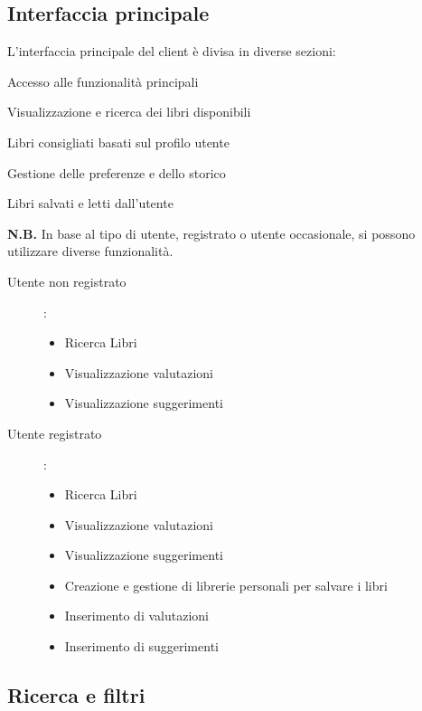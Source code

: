 \documentclass[12pt,a4paper]{article}
\begin{document}
\subsection{Interfaccia principale}

L'interfaccia principale del client è divisa in diverse sezioni:

\begin{description}[style=multiline, labelwidth=4cm, leftmargin=4.4cm]
    \item[Menu principale] Accesso alle funzionalità principali
    \item[Catalogo libri] Visualizzazione e ricerca dei libri disponibili
    \item[Raccomandazioni] Libri consigliati basati sul profilo utente
    \item[Profilo utente] Gestione delle preferenze e dello storico
    \item[Biblioteca personale] Libri salvati e letti dall'utente
\end{description}
\textbf{N.B.}
In base al tipo di utente, registrato o utente occasionale, si possono utilizzare diverse funzionalità.
\begin{description}
    \item[Utente non registrato]:
    \begin{itemize}
        \item Ricerca Libri
        \item Visualizzazione valutazioni
        \item Visualizzazione suggerimenti
    \end{itemize}
    \item[Utente registrato]:
    \begin{itemize}
        \item Ricerca Libri
        \item Visualizzazione valutazioni
        \item Visualizzazione suggerimenti
        \item Creazione e gestione di librerie personali per salvare i libri
        \item Inserimento di valutazioni
        \item Inserimento di suggerimenti
    \end{itemize}
\end{description}

\subsection{Ricerca e filtri}
\end{document}
